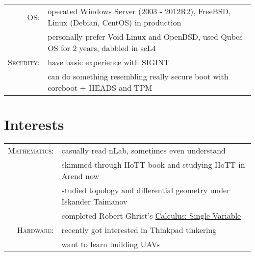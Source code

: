 \documentclass[a4paper,11pt]{article}
\begin{document}
\begin{longtable}{rp{}}
      \textsc{OS:} & operated Windows Server (2003 - 2012R2), FreeBSD, Linux (Debian, CentOS) in production \\
                   & personally prefer Void Linux and OpenBSD, used Qubes OS for 2 years, dabbled in seL4   \\

      \textsc{Security:} & have basic experience with SIGINT                                            \\
                         & can do something resembling really secure boot with coreboot + HEADS and TPM \\
    \end{longtable}

  \section{Interests}
    \begin{tabular}{rl}
      \textsc{Mathematics:} & casually read nLab, sometimes even understand                      \\
                            & skimmed through HoTT book and studying HoTT in Arend now           \\
                            & studied topology and differential geometry under Iskander Taimanov \\
                            & completed Robert Ghrist's
                              \href{https://www.coursera.org/account/accomplishments/records/9Y3N9X2BMR}{Calculus:
                              Single Variable} \\
      \textsc{Hardware:} & recently got interested in Thinkpad tinkering \\
                         & want to learn building UAVs                   \\
    \end{tabular}
\end{document}
